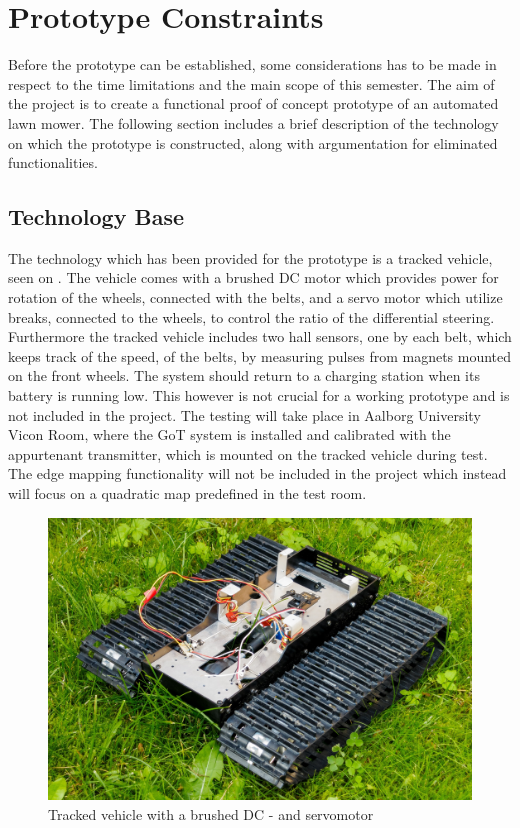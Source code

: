 \section{Prototype Constraints}
Before the prototype can be established, some considerations has to be made in respect to the time limitations and the main scope of this semester. The aim of the project is to create a functional proof of concept prototype of an automated lawn mower. The following section includes a brief description of the technology on which the prototype is constructed, along with argumentation for eliminated functionalities.

\subsection{Technology Base}
The technology which has been provided for the prototype is a tracked vehicle, seen on . The vehicle comes with a brushed DC motor which provides power for rotation of the wheels, connected with the belts, and a servo motor which utilize breaks, connected to the wheels, to control the ratio of the differential steering. Furthermore the tracked vehicle includes two hall sensors, one by each belt, which keeps track of the speed, of the belts, by measuring pulses from magnets mounted on the front wheels.
The system should return to a charging station when its battery is running low. This however is not crucial for a working prototype and is not included in the project.
The testing will take place in Aalborg University Vicon Room, where the GoT system is installed and calibrated with the appurtenant transmitter, which is mounted on the tracked vehicle during test. The edge mapping functionality will not be included in the project which instead will focus on a quadratic map predefined in the test room.

\begin{figure}[H]
	\centering
	\includegraphics[scale=0.1]{figures/BeltVehicle.jpg}
	\flushleft
	\caption{Tracked vehicle with a brushed DC - and servomotor}
	\label{TrackedVehicle}
\end{figure}

